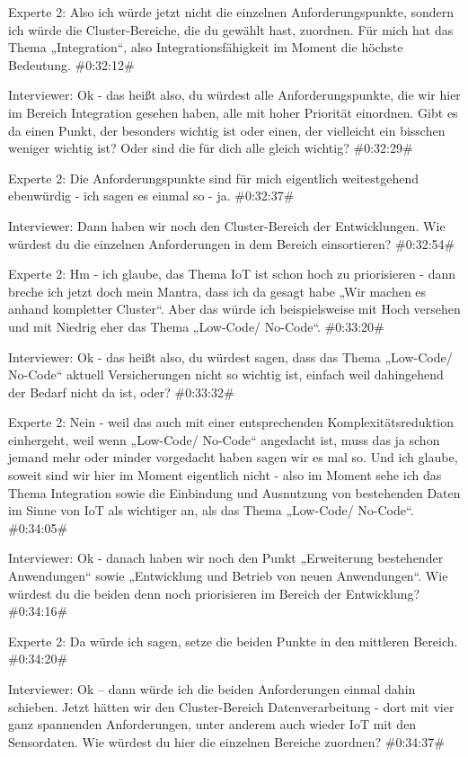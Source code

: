 Experte 2:
Also ich würde jetzt nicht die einzelnen Anforderungspunkte, sondern ich würde die Cluster-Bereiche, die du gewählt hast, zuordnen. Für mich hat das Thema „Integration“, also Integrationsfähigkeit im Moment die höchste Bedeutung.
\#0:32:12\#

Interviewer:
Ok - das heißt also, du würdest alle Anforderungspunkte, die wir hier im Bereich Integration gesehen haben, alle mit hoher Priorität einordnen. Gibt es da einen Punkt, der besonders wichtig ist oder einen, der vielleicht ein bisschen weniger wichtig ist? Oder sind die für dich alle gleich wichtig?
\#0:32:29\#

Experte 2:
Die Anforderungspunkte sind für mich eigentlich weitestgehend ebenwürdig - ich sagen es einmal so - ja.
\#0:32:37\#

Interviewer:
Dann haben wir noch den Cluster-Bereich der Entwicklungen. Wie würdest du die einzelnen Anforderungen in dem Bereich einsortieren?
\#0:32:54\#

Experte 2:
Hm - ich glaube, das Thema IoT ist schon hoch zu priorisieren - dann breche ich jetzt doch mein Mantra, dass ich da gesagt habe „Wir machen es anhand kompletter Cluster“. Aber das würde ich beispielsweise mit Hoch versehen und mit Niedrig eher das Thema „Low-Code/ No-Code“.
\#0:33:20\#

Interviewer:
Ok - das heißt also, du würdest sagen, dass das Thema „Low-Code/ No-Code“ aktuell Versicherungen nicht so wichtig ist, einfach weil dahingehend der Bedarf nicht da ist, oder?
\#0:33:32\#

Experte 2:
Nein - weil das auch mit einer entsprechenden Komplexitätsreduktion einhergeht, weil wenn „Low-Code/ No-Code“ angedacht ist, muss das ja schon jemand mehr oder minder vorgedacht haben sagen wir es mal so. Und ich glaube, soweit sind wir hier im Moment eigentlich nicht - also im Moment sehe ich das Thema Integration sowie die Einbindung und Ausnutzung von bestehenden Daten im Sinne von IoT als wichtiger an, als das Thema „Low-Code/ No-Code“.
\#0:34:05\#

Interviewer:
Ok - danach haben wir noch den Punkt „Erweiterung bestehender Anwendungen“ sowie „Entwicklung und Betrieb von neuen Anwendungen“. Wie würdest du die beiden denn noch priorisieren im Bereich der Entwicklung?
\#0:34:16\#

Experte 2:
Da würde ich sagen, setze die beiden Punkte in den mittleren Bereich.
\#0:34:20\#

Interviewer:
Ok – dann würde ich die beiden Anforderungen einmal dahin schieben. Jetzt hätten wir den Cluster-Bereich Datenverarbeitung - dort mit vier ganz spannenden Anforderungen, unter anderem auch wieder IoT mit den Sensordaten. Wie würdest du hier die einzelnen Bereiche zuordnen?
\#0:34:37\#

